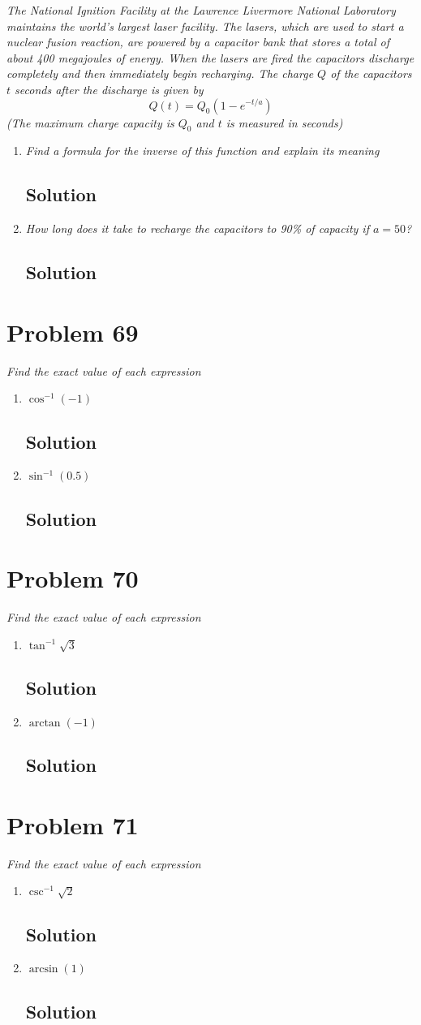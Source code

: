 \documentclass[11pt]{article}
\newcommand{\soln}{\subsection*}
\newcommand{\qn}{\textit}
\begin{document}
\qn{The National Ignition Facility at the Lawrence Livermore National Laboratory maintains the world's largest laser facility. The lasers, which are used to start a nuclear fusion reaction, are powered by a capacitor bank that stores a total of about 400 megajoules of energy. When the lasers are fired the capacitors discharge completely and then immediately begin recharging. The charge $Q$ of the capacitors $t$ seconds after the discharge is given by $$Q(t)=Q_0(1-e^{-t/a})$$ (The maximum charge capacity is $Q_0$ and $t$ is measured in seconds)}
\begin{enumerate}
	\item \qn{Find a formula for the inverse of this function and explain its meaning}
	\soln{Solution}
	
	\item \qn{How long does it take to recharge the capacitors to 90\% of capacity if $a=50$?}
	\soln{Solution}
\end{enumerate}

\section*{Problem 69}

\qn{Find the exact value of each expression}
\begin{enumerate}
	\item \qn{$\cos^{-1}(-1)$}
	\soln{Solution}
	
	\item \qn{$\sin^{-1}(0.5)$}
	\soln{Solution}
\end{enumerate}

\section*{Problem 70}

\qn{Find the exact value of each expression}
\begin{enumerate}
	\item \qn{$\tan^{-1}\sqrt{3}$}
	\soln{Solution}
	
	\item \qn{$\arctan(-1)$}
	\soln{Solution}
\end{enumerate}

\section*{Problem 71}

\qn{Find the exact value of each expression}
\begin{enumerate}
	\item \qn{$\csc^{-1}\sqrt{2}$}
	\soln{Solution}
	
	\item \qn{$\arcsin(1)$}
	\soln{Solution}
\end{enumerate}
\end{document}
